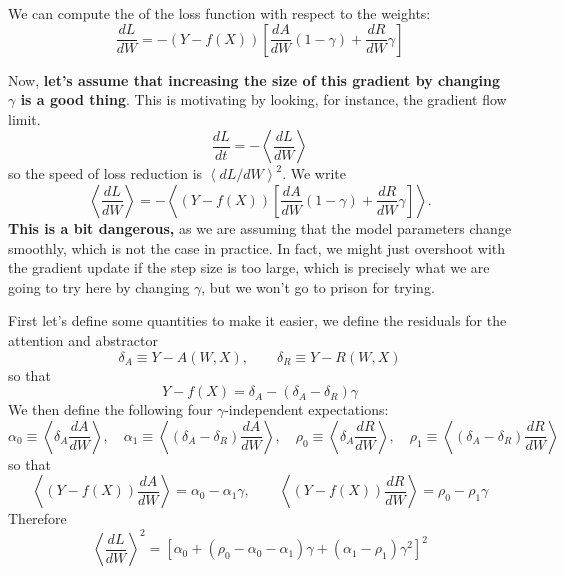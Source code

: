 \documentclass[12pt]{article}
\begin{document}
We can compute the of the loss function with respect to the weights:
\begin{equation}
    \frac{dL}{dW} = -(Y - f(X))\left[\frac{dA}{dW}(1-\gamma) + \frac{dR}{dW}\gamma\right]
\end{equation}

Now, \textbf{let's assume that increasing the size of this gradient by changing $\gamma$ is a good thing}. This is motivating by looking, for instance, the gradient flow limit.
\begin{equation}
    \frac{dL}{dt} = -\left\langle\frac{dL}{dW}\right\rangle
\end{equation}
so the speed of loss reduction is $\left\langle dL/dW\right\rangle^2$. We write
\begin{equation}
    \left\langle \frac{dL}{dW} \right\rangle = -\left\langle (Y - f(X))\left[\frac{dA}{dW}(1-\gamma) + \frac{dR}{dW}\gamma\right] \right\rangle.
\end{equation} \textbf{This is a bit dangerous,} as we are assuming that the model parameters change smoothly, which is not the case in practice. In fact, we might just overshoot with the gradient update if the step size is too large, which is precisely what we are going to  try here by changing $\gamma$, but we won't go to prison for trying.

First let's define some quantities to make it easier, we define the residuals for the attention and abstractor 
\begin{equation}
    \delta_A \equiv Y - A(W,X), \qquad \delta_R \equiv Y - R(W,X)
\end{equation}
so that
\begin{equation}
    Y - f(X) = \delta_A - (\delta_A - \delta_R)\gamma
\end{equation}
We then define the following four $\gamma$-independent expectations:
\begin{equation}
    \alpha_0 \equiv \left\langle \delta_A \frac{dA}{dW}\right\rangle, \quad
    \alpha_1 \equiv \left\langle (\delta_A-\delta_R)\frac{dA}{dW}\right\rangle, \quad
    \rho_0   \equiv \left\langle \delta_A \frac{dR}{dW}\right\rangle,   \quad
    \rho_1   \equiv \left\langle (\delta_A-\delta_R)\frac{dR}{dW}\right\rangle
\end{equation}
so that
\begin{equation}
    \left\langle (Y-f(X))\frac{dA}{dW} \right\rangle = \alpha_0 - \alpha_1\gamma, \qquad
    \left\langle (Y-f(X))\frac{dR}{dW} \right\rangle = \rho_0  - \rho_1\gamma
\end{equation}
Therefore
\begin{equation}
    \left\langle \frac{dL}{dW} \right\rangle^2 = \left[\alpha_0 + (\rho_0 - \alpha_0 - \alpha_1)\gamma + (\alpha_1 - \rho_1)\gamma^2\right]^2
\end{equation}
\end{document}

